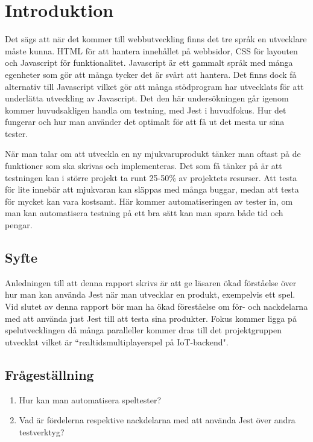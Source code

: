 \section{Introduktion}
\label{sec:david-introduction}

Det sägs att när det kommer till webbutveckling finns det tre språk en utvecklare måste kunna. HTML för att hantera innehållet på webbsidor, CSS för layouten och Javascript för funktionalitet. Javascript är ett gammalt språk med många egenheter som gör att många tycker det är svårt att hantera. Det finns dock få alternativ till Javascript vilket gör att många stödprogram har utvecklats för att underlätta utveckling av Javascript. Det den här undersökningen går igenom kommer huvudsakligen handla om testning, med Jest\cite{bib-jest} i huvudfokus. Hur det fungerar och hur man använder det optimalt för att få ut det mesta ur sina tester.

När man talar om att utveckla en ny mjukvaruprodukt tänker man oftast på de funktioner som ska skrivas och implementeras. Det som få tänker på är att testningen kan i större projekt ta runt 25-50\%\cite{ADP} av projektets resurser. Att testa för lite innebär att mjukvaran kan släppas med många buggar, medan att testa för mycket kan vara kostsamt. Här kommer automatiseringen av tester in, om man kan automatisera testning på ett bra sätt kan man spara både tid och pengar.

\subsection{Syfte}
Anledningen till att denna rapport skrivs är att ge läsaren ökad förståelse över hur man kan använda Jest när man utvecklar en produkt, exempelvis ett spel. Vid slutet av denna rapport bör man ha ökad föreståelse om för- och nackdelarna med att använda just Jest till att testa sina produkter. Fokus kommer ligga på spelutvecklingen då många paralleller kommer dras till det projektgruppen utvecklat vilket är ``realtidsmultiplayerspel på IoT-backend". 




\subsection{Frågeställning}
\label{subsec:david-research-questions}

\begin{enumerate}
\item Hur kan man automatisera speltester?
\item Vad är fördelerna respektive nackdelarna med att använda Jest över andra testverktyg?

\end{enumerate}

